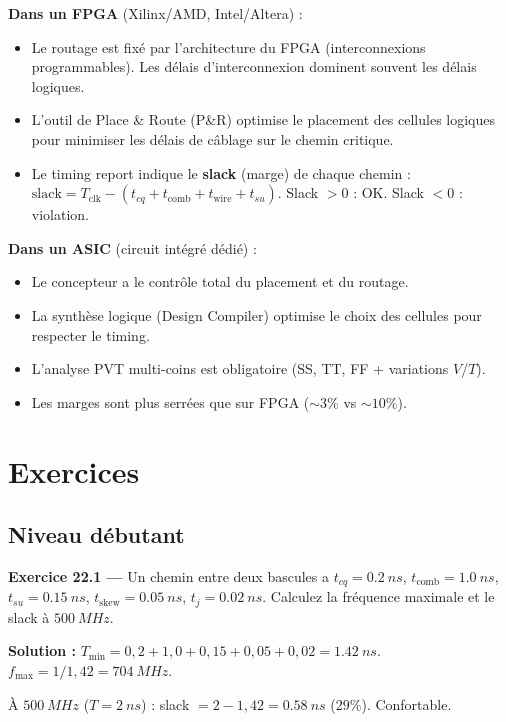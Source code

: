 \documentclass[12pt,a4paper,twoside]{book}
\begin{document}
\begin{pratique}
\textbf{Dans un FPGA} (Xilinx/AMD, Intel/Altera) :
\begin{itemize}[nosep]
\item Le routage est fixé par l'architecture du FPGA (interconnexions programmables). Les délais d'interconnexion dominent souvent les délais logiques.
\item L'outil de Place \& Route (P\&R) optimise le placement des cellules logiques pour minimiser les délais de câblage sur le chemin critique.
\item Le timing report indique le \textbf{slack} (marge) de chaque chemin : $\text{slack} = T_{\text{clk}} - (t_{cq} + t_{\text{comb}} + t_{\text{wire}} + t_{su})$. Slack $> 0$ : OK. Slack $< 0$ : violation.
\end{itemize}

\textbf{Dans un ASIC} (circuit intégré dédié) :
\begin{itemize}[nosep]
\item Le concepteur a le contrôle total du placement et du routage.
\item La synthèse logique (Design Compiler) optimise le choix des cellules pour respecter le timing.
\item L'analyse PVT multi-coins est obligatoire (SS, TT, FF + variations $V$/$T$).
\item Les marges sont plus serrées que sur FPGA ($\sim 3\%$ vs $\sim 10\%$).
\end{itemize}
\end{pratique}

\section*{Exercices}

\subsection*{Niveau débutant}

\textbf{Exercice 22.1 ---} Un chemin entre deux bascules a $t_{cq} = \SI{0.2}{ns}$, $t_{\text{comb}} = \SI{1.0}{ns}$, $t_{su} = \SI{0.15}{ns}$, $t_{\text{skew}} = \SI{0.05}{ns}$, $t_j = \SI{0.02}{ns}$. Calculez la fréquence maximale et le slack à $\SI{500}{MHz}$.

\begin{pratique}
\textbf{Solution :} $T_{\min} = 0{,}2 + 1{,}0 + 0{,}15 + 0{,}05 + 0{,}02 = \SI{1.42}{ns}$. $f_{\max} = 1/1{,}42 = \SI{704}{MHz}$.

À $\SI{500}{MHz}$ ($T = \SI{2}{ns}$) : slack $= 2 - 1{,}42 = \SI{0.58}{ns}$ ($29\%$). Confortable.
\end{pratique}
\end{document}
